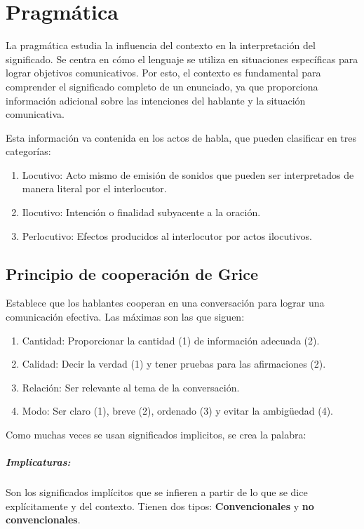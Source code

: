 \documentclass{report}
\def\profundidadIndiceCapitulo{subsubsection}
\begin{document}
\chapter{Pragmática}
\etocframedstyle[1]{}
\etocsetnexttocdepth{\profundidadIndiceCapitulo}
\localtableofcontents


La pragmática estudia la influencia del contexto en la interpretación del significado. Se centra en cómo el lenguaje se utiliza en situaciones específicas para lograr objetivos comunicativos.
Por esto, el contexto es fundamental para comprender el significado completo de un enunciado, ya que proporciona información adicional sobre las intenciones del hablante y la situación comunicativa.

Esta información va contenida en los actos de habla, que pueden clasificar en tres categorías:
\begin{enumerate}
    \item {Locutivo:} Acto mismo de emisión de sonidos que pueden ser interpretados de manera literal por el interlocutor.
    \item{Ilocutivo:} Intención o finalidad subyacente a la oración.
    \item{Perlocutivo:} Efectos producidos al interlocutor por actos ilocutivos.
\end{enumerate}

\section{Principio de cooperación de Grice}
Establece que los hablantes cooperan en una conversación para lograr una comunicación efectiva.
Las máximas son las que siguen:
\begin{enumerate}
    \item {Cantidad:} Proporcionar la cantidad (1) de información adecuada (2).
    \item {Calidad:} Decir la verdad (1) y tener pruebas para las afirmaciones (2).
    \item {Relación:} Ser relevante al tema de la conversación.
    \item {Modo:}  Ser claro (1), breve (2), ordenado (3) y evitar la ambigüedad (4).
\end{enumerate}

Como muchas veces se usan significados implicitos, se crea la palabra:
\paragraph{Implicaturas:}Son los significados implícitos que se infieren a partir de lo que se dice explícitamente y del contexto.
Tienen dos tipos: \textbf{Convencionales} y \textbf{no convencionales}.
\end{document}
